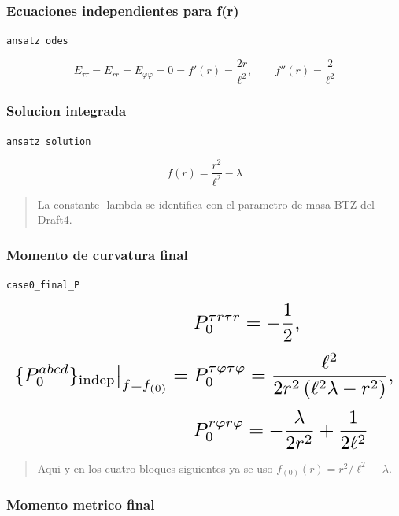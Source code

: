 \documentclass[11pt,a4paper]{article}
\begin{document}
\subsubsection{Ecuaciones independientes para f(r)}

\noindent\texttt{ansatz\_odes}\par\nopagebreak[4]

\[
E_{\tau\tau}=E_{rr}=E_{\varphi\varphi}=0 = f'(r)=\frac{2r}{\ell^2},\qquad f''(r)=\frac{2}{\ell^2}
\]

\subsubsection{Solucion integrada}

\noindent\texttt{ansatz\_solution}\par\nopagebreak[4]

\[
f(r) = \frac{r^2}{\ell^2}-\lambda
\]

\begin{quote}\small La constante -lambda se identifica con el parametro de masa BTZ del Draft4.\end{quote}

\subsubsection{Momento de curvatura final}

\noindent\texttt{case0\_final\_P}\par\nopagebreak[4]

\[
\resizebox{\textwidth}{!}{$\displaystyle \{P_0^{abcd}\}_{\mathrm{indep}}\big|_{f=f_{(0)}} = \begin{aligned}&P_0^{{\tau}{r}{\tau}{r}}=- \frac{1}{2},\\[2pt]&P_0^{{\tau}{\varphi}{\tau}{\varphi}}=\frac{\ell^{2}}{2 r^{2} \left(\ell^{2} \lambda - r^{2}\right)},\\[2pt]&P_0^{{r}{\varphi}{r}{\varphi}}=- \frac{\lambda}{2 r^{2}} + \frac{1}{2 \ell^{2}}\end{aligned}$}
\]

\begin{quote}\small Aqui y en los cuatro bloques siguientes ya se uso \(f_{(0)}(r)=r^2/\ell^2-\lambda\).\end{quote}

\subsubsection{Momento metrico final}
\end{document}
